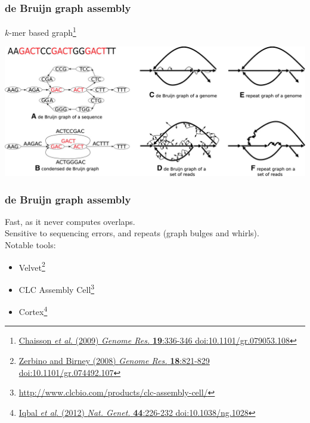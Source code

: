 \begin{frame}
  \frametitle{de Bruijn graph assembly}
  $k$-mer based graph\footnote{\tiny{\href{http://dx.doi.org/10.1101/gr.079053.108}{Chaisson \textit{et al}. (2009) \textit{Genome Res.} \textbf{19}:336-346 doi:10.1101/gr.079053.108}}}
  \begin{center}
    \includegraphics[width=1\textwidth]{images/de_bruijn_repeats}
  \end{center}  
\end{frame}

\begin{frame}
  \frametitle{de Bruijn graph assembly}
  Fast, as it never computes overlaps.\\[0.5cm]
  Sensitive to sequencing errors, and repeats (graph bulges and whirls).\\[0.5cm]
  Notable tools:
  \begin{itemize}
    \item Velvet\footnote{\tiny{\href{http://dx.doi.org/10.1101/gr.074492.107}{Zerbino and Birney (2008) \textit{Genome Res.} \textbf{18}:821-829 doi:10.1101/gr.074492.107}}}
    \item CLC Assembly Cell\footnote{\tiny{\href{http://www.clcbio.com/products/clc-assembly-cell/}{http://www.clcbio.com/products/clc-assembly-cell/}}}
    \item Cortex\footnote{\tiny{\href{http://dx.doi.org/10.1038/ng.1028}{Iqbal \textit{et al}. (2012) \textit{Nat. Genet.} \textbf{44}:226-232 doi:10.1038/ng.1028}}}
  \end{itemize}
\end{frame}

